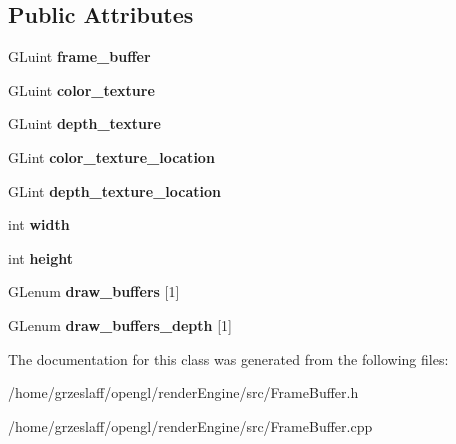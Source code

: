 \subsection*{Public Attributes}
\begin{DoxyCompactItemize}
\item 
\hypertarget{classFrameBuffer_ad44f1ef466eb1ff32f6aefb207471f65}{G\-Luint {\bfseries frame\-\_\-buffer}}\label{classFrameBuffer_ad44f1ef466eb1ff32f6aefb207471f65}

\item 
\hypertarget{classFrameBuffer_ae97d930f76ec683fc0bb1913f66ff36c}{G\-Luint {\bfseries color\-\_\-texture}}\label{classFrameBuffer_ae97d930f76ec683fc0bb1913f66ff36c}

\item 
\hypertarget{classFrameBuffer_a067b1f0a6a7519c7a7137e4cd828b497}{G\-Luint {\bfseries depth\-\_\-texture}}\label{classFrameBuffer_a067b1f0a6a7519c7a7137e4cd828b497}

\item 
\hypertarget{classFrameBuffer_a8aed44951acef62df0a5829e8e477bd2}{G\-Lint {\bfseries color\-\_\-texture\-\_\-location}}\label{classFrameBuffer_a8aed44951acef62df0a5829e8e477bd2}

\item 
\hypertarget{classFrameBuffer_a98977543c8409362579fdb55205e1ebe}{G\-Lint {\bfseries depth\-\_\-texture\-\_\-location}}\label{classFrameBuffer_a98977543c8409362579fdb55205e1ebe}

\item 
\hypertarget{classFrameBuffer_ac09ee7577229126ecb519c0d9efb284b}{int {\bfseries width}}\label{classFrameBuffer_ac09ee7577229126ecb519c0d9efb284b}

\item 
\hypertarget{classFrameBuffer_a4bba1e0559f4a1cb66676b3dbbdd367f}{int {\bfseries height}}\label{classFrameBuffer_a4bba1e0559f4a1cb66676b3dbbdd367f}

\item 
\hypertarget{classFrameBuffer_a6b5a5cd6a2497312b57c1da4a749e160}{G\-Lenum {\bfseries draw\-\_\-buffers} \mbox{[}1\mbox{]}}\label{classFrameBuffer_a6b5a5cd6a2497312b57c1da4a749e160}

\item 
\hypertarget{classFrameBuffer_a7a768d8c547289254664d7476689c132}{G\-Lenum {\bfseries draw\-\_\-buffers\-\_\-depth} \mbox{[}1\mbox{]}}\label{classFrameBuffer_a7a768d8c547289254664d7476689c132}

\end{DoxyCompactItemize}


The documentation for this class was generated from the following files\-:\begin{DoxyCompactItemize}
\item 
/home/grzeslaff/opengl/render\-Engine/src/Frame\-Buffer.\-h\item 
/home/grzeslaff/opengl/render\-Engine/src/Frame\-Buffer.\-cpp\end{DoxyCompactItemize}

